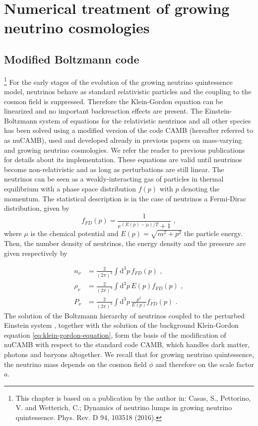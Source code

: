 \section{Numerical treatment of growing neutrino cosmologies \label{sec:GNQ-numerics}}


\subsection{Modified Boltzmann code \label{sub:Modified-Boltzmann-code}}

\footnote{This chapter is based on a publication by the author in: 
	Casas, S., Pettorino, V. and Wetterich, C.;
	Dynamics of neutrino lumps in growing neutrino quintessence.
	Phys. Rev. D 94, 103518 (2016).
}
For the early stages of the evolution of the growing neutrino quintessence
model, neutrinos behave as standard relativistic particles and the
coupling to the cosmon field is suppressed. Therefore the Klein-Gordon
equation can be linearized and no important backreaction effects are
present. The Einstein-Boltzmann system of equations for the relativistic
neutrinos and all other species has been solved using a modified version
of the code CAMB \cite{lewis_efficient_2000} (hereafter referred
to as nuCAMB), used and developed already in previous papers on mass-varying
and growing neutrino cosmologies. We refer the reader to previous
publications \cite{mota_neutrino_2008,pettorino_neutrino_2010,wintergerst_very_2010,brookfield_cosmology_2007}
for details about its implementation. These equations are valid until
neutrinos become non-relativistic and as long as perturbations are
still linear. The neutrinos can be seen as a weakly-interacting gas
of particles in thermal equilibrium with a phase space distribution
$f(p)$ with $p$ denoting the momentum. The statistical description
is in the case of neutrinos a Fermi-Dirac distribution, given by 
\begin{equation}
f_{FD}(p)=\frac{1}{e^{\left(E(p)-\mu\right)/T}+1}\,\,,\label{eq:Fermi-Dirac-dist}
\end{equation}
where $\mu$ is the chemical potential and $E(p)=\sqrt{m^{2}+p^{2}}$
the particle energy. Then, the number density of neutrinos, the energy
density and the pressure are given respectively by

\begin{align}
n_{\nu} & =\frac{2}{(2\pi)^{3}}\int\mbox{d}^{3}p\, f_{FD}(p)\,\,,\label{eq:nnu-FD}\\
\rho_{\nu} & =\frac{2}{(2\pi)^{3}}\int\mbox{d}^{3}p\, E(p)f_{FD}(p)\,\,,\label{eq:rhonu-FD}\\
P_{\nu} & =\frac{2}{(2\pi)^{3}}\int\mbox{d}^{3}p\,\frac{p^{2}}{E(p)}f_{FD}(p)\,\,.\label{eq:pnu-FD}
\end{align}
The solution of the Boltzmann hierarchy of neutrinos coupled to the
perturbed Einstein system ,
together with the solution of the background Klein-Gordon equation
\ref{eq:klein-gordon-equation}, form the basis of the modification
of nuCAMB with respect to the standard code CAMB, which handles dark
matter, photons and baryons altogether. We recall that for growing
neutrino quintessence, the neutrino mass depends on the cosmon field
$\phi$ and therefore on the scale factor $a$.

